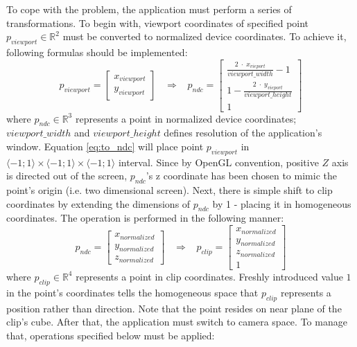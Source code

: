 \documentclass{report}
\begin{document}
To cope with the problem, the application must perform a series of transformations. To begin with, viewport coordinates of specified point $p_{viewport} \in \mathbb{R}^{2}$ must be converted to normalized device coordinates. To achieve it, following formulas should be implemented:
\begin{equation} \label{eq:to_ndc}
p_{viewport} = \begin{bmatrix}
           x_{viewport}\\
           y_{viewport}
\end{bmatrix} \; \; \; \Rightarrow \; \; \; 
p_{ndc} = \begin{bmatrix}
           \frac{2 \; \cdot \; x_{vieport}}{viewport\_width} - 1 \\
           1 - \frac{2 \; \cdot \; y_{vieport}}{viewport\_height} \\
           1
\end{bmatrix}
\end{equation}
where $p_{ndc} \in \mathbb{R}^{3}$ represents a point in normalized device coordinates; $viewport\_width$ and $viewport\_height$ defines resolution of the application's window. Equation \ref{eq:to_ndc} will place point $p_{viewport}$ in $\langle -1; 1 \rangle \times \langle -1; 1 \rangle \times \langle -1; 1 \rangle$ interval. Since by OpenGL convention, positive $Z$ axis is directed out of the screen, $p_{ndc}$'s z coordinate has been chosen to mimic the point's origin (i.e. two dimensional screen). Next, there is simple shift to clip coordinates by extending the dimensions of $p_{ndc}$ by 1 - placing it in homogeneous coordinates. The operation is performed in the following manner:
\begin{equation} \label{eq:to_clip}
p_{ndc} = \begin{bmatrix}
           x_{normalized}\\
           y_{normalized} \\
           z_{normalized}
\end{bmatrix} \; \; \; \Rightarrow \; \; \; 
p_{clip} = \begin{bmatrix}
           x_{normalized} \\
           y_{normalized} \\
           z_{normalized} \\
           1
\end{bmatrix}
\end{equation}
where $p_{clip} \in \mathbb{R}^{4}$ represents a point in clip coordinates. Freshly introduced value $1$ in the point's coordinates tells the homogeneous space that $p_{clip}$ represents a position rather than direction. Note that the point resides on near plane of the clip's cube. After that, the application must switch to camera space. To manage that, operations specified below must be applied:
\end{document}
